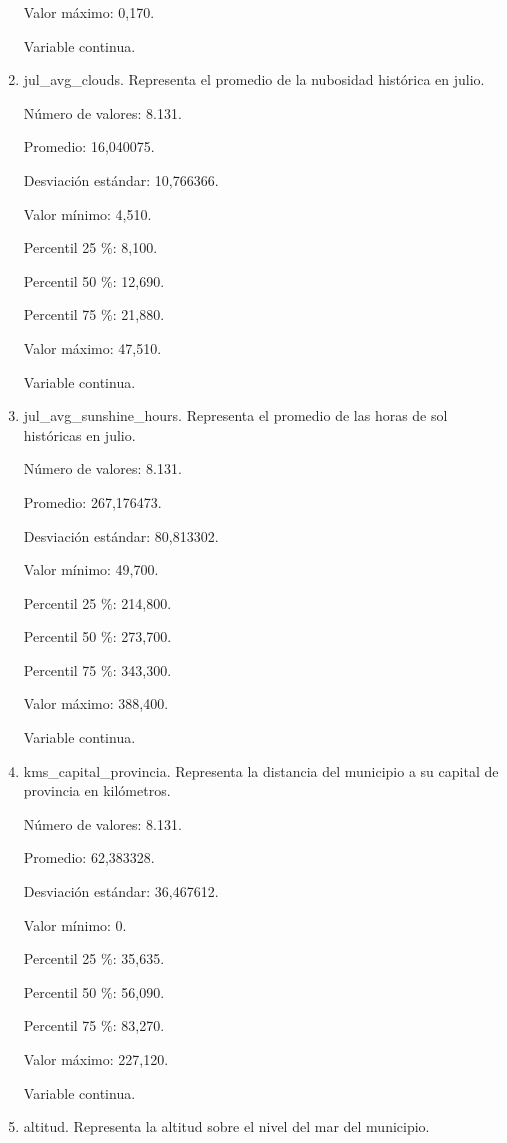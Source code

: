 \begin{enumerate}
	Valor máximo: 0,170.
	
	Variable continua.

	\item jul\_avg\_clouds. Representa el promedio de la nubosidad histórica en julio.
	
	Número de valores: 8.131.
	
	Promedio: 16,040075.
	
	Desviación estándar: 10,766366.
	
	Valor mínimo: 4,510.
	
	Percentil 25 \%: 8,100.
	
	Percentil 50 \%: 12,690.
	
	Percentil 75 \%: 21,880.
	
	Valor máximo: 47,510.
	
	Variable continua.

	\item jul\_avg\_sunshine\_hours. Representa el promedio de las horas de sol históricas en julio.
	
	Número de valores: 8.131.
	
	Promedio: 267,176473.
	
	Desviación estándar: 80,813302.
	
	Valor mínimo: 49,700.
	
	Percentil 25 \%: 214,800.
	
	Percentil 50 \%: 273,700.
	
	Percentil 75 \%: 343,300.
	
	Valor máximo: 388,400.
	
	Variable continua.

	\item kms\_capital\_provincia. Representa la distancia del municipio a su capital de provincia en kilómetros.
	
	Número de valores: 8.131.
	
	Promedio: 62,383328.
	
	Desviación estándar: 36,467612.
	
	Valor mínimo: 0.
	
	Percentil 25 \%: 35,635.
	
	Percentil 50 \%: 56,090.
	
	Percentil 75 \%: 83,270.
	
	Valor máximo: 227,120.
	
	Variable continua.

	\item altitud. Representa la altitud sobre el nivel del mar del municipio.
	

\end{enumerate}
